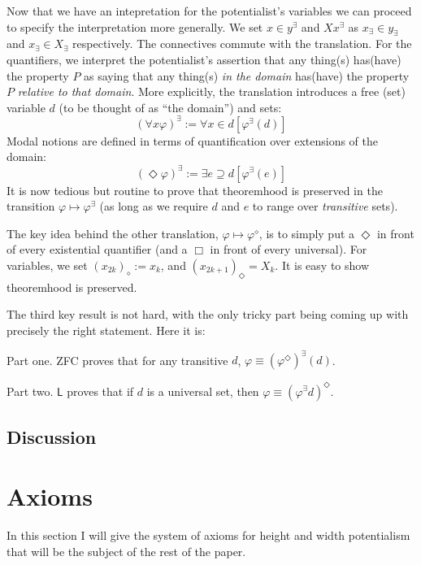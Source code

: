 \documentclass{article}
\begin{document}
Now that we have an intepretation for the potentialist's variables we can proceed to specify 
the interpretation more generally. We set $x \in y^\exists$ and $Xx^\exists$ as $x_\exists \in y_\exists$ 
and $x_\exists \in X_\exists$ respectively. The connectives commute with the translation. For the quantifiers,
we interpret the potentialist's assertion that any thing(s) has(have) the property $P$ as saying 
that any thing(s) \emph{in the domain} has(have) the property $P$ \emph{relative to that domain}. More explicitly, 
the translation introduces a free (set) variable $d$ (to be thought of as ``the domain'') and sets:
\[(\forall x \varphi)^\exists := \forall x \in d [\varphi^\exists(d)]\]
Modal notions are defined in terms of quantification over extensions of the domain:
\[ (\Diamond \varphi)^\exists := \exists e \supseteq d [\varphi^\exists(e)]\]
It is now tedious but routine to prove that theoremhood is preserved 
in the transition $\varphi \mapsto \varphi^\exists$ (as long as we require $d$ and $e$ 
to range over \emph{transitive} sets).

The key idea behind the other translation, $\varphi \mapsto \varphi^\diamond$, 
is to simply put a $\Diamond$ in front of every existential quantifier (and a $\Box$ in front of 
every universal). For variables, we set $(x_{2k})_\diamond := x_k$, and $(x_{2k+1})_\Diamond = X_k$.
It is easy to show theoremhood is preserved.

The third key result is not hard, with the only tricky part being coming up with precisely 
the right statement. Here it is:

Part one. ZFC proves that for any transitive $d$, 
$\varphi \equiv (\varphi^\Diamond)^\exists(d)$.

Part two. $\mathsf{L}$ proves that if $d$ is a universal set,
then $\varphi \equiv (\varphi^\exists d)^\Diamond$.


\subsection{Discussion}
\section{Axioms}
In this section I will give the system of axioms for height and width potentialism 
that will be the subject of the rest of the paper.
\end{document}
